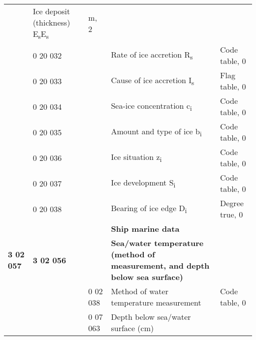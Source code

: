 \begin{longtable}[]{@{}lllll@{}}
\begin{minipage}[t]{0.17\columnwidth}
{\subsection{}\label{section-2}}\strut
\end{minipage} & \begin{minipage}[t]{0.17\columnwidth}\raggedright
Ice deposit (thickness) E\textsubscript{s}E\textsubscript{s}\strut
\end{minipage} & \begin{minipage}[t]{0.17\columnwidth}\raggedright
m, 2\strut
\end{minipage}\tabularnewline
\begin{minipage}[t]{0.17\columnwidth}\raggedright
\strut
\end{minipage} & \begin{minipage}[t]{0.17\columnwidth}\raggedright
0 20 032\strut
\end{minipage} & \begin{minipage}[t]{0.17\columnwidth}\raggedright
\hypertarget{section-3}{%
\subsection{}\label{section-3}}\strut
\end{minipage} & \begin{minipage}[t]{0.17\columnwidth}\raggedright
Rate of ice accretion R\textsubscript{s}\strut
\end{minipage} & \begin{minipage}[t]{0.17\columnwidth}\raggedright
Code table, 0\strut
\end{minipage}\tabularnewline
& 0 20 033 & & Cause of ice accretion I\textsubscript{s} & Flag table, 0\tabularnewline
& 0 20 034 & & Sea-ice concentration c\textsubscript{i} & Code table, 0\tabularnewline
& 0 20 035 & & Amount and type of ice b\textsubscript{i} & Code table, 0\tabularnewline
& 0 20 036 & & Ice situation z\textsubscript{i} & Code table, 0\tabularnewline
& 0 20 037 & & Ice development S\textsubscript{i} & Code table, 0\tabularnewline
& 0 20 038 & & Bearing of ice edge D\textsubscript{i} & Degree true, 0\tabularnewline
& & & \textbf{Ship marine data} &\tabularnewline
\textbf{3 02 057} & \textbf{3 02 056} & & \textbf{Sea/water temperature (method of measurement, and depth below sea surface)} &\tabularnewline
& & 0 02 038 & Method of water temperature measurement & Code table, 0\tabularnewline
\begin{minipage}[t]{0.17\columnwidth}\raggedright
\strut
\end{minipage} & \begin{minipage}[t]{0.17\columnwidth}\raggedright
\strut
\end{minipage} & \begin{minipage}[t]{0.17\columnwidth}\raggedright
0 07 063\strut
\end{minipage} & \begin{minipage}[t]{0.17\columnwidth}\raggedright
Depth below sea/water surface (cm)


\end{minipage}
\end{longtable}
